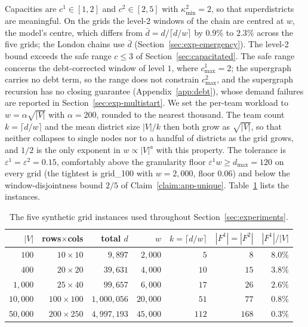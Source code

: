\documentclass[preprint,12pt,authoryear]{elsarticle}
\theoremstyle{definition}
\begin{document}
Capacities are $c^1 \in [1,2]$ and $c^2 \in [2,5]$ with $\kappa^2_{\min} = 2$, so that superdistricts are meaningful. On the grids the level-2 windows of the chain are centred at $w$, the model's centre, which differs from $\bar d = d/\lceil d/w \rceil$ by $0.9\%$ to $2.3\%$ across the five grids; the London chains use $\bar d$ (Section~\ref{sec:exp-emergency}). The level-2 bound exceeds the safe range 
$c \leq 3$ of Section~\ref{sec:capacitated}. The safe range concerns the debt-corrected window of level $1$, where $c^1_{\max} = 2$; the supergraph carries no debt term, so the range does not constrain $c^2_{\max}$, and the supergraph recursion has no closing guarantee (Appendix~\ref{app:debt}), whose demand failures are reported in Section~\ref{sec:exp-multistart}. We set the 
per-team workload to $w = \alpha \sqrt{|V|}$ with $\alpha = 200$, rounded to the 
nearest thousand. The team count $k = \lceil d / w \rceil$ and the mean district 
size $|V|/k$ then both grow as $\sqrt{|V|}$, so that neither collapses to single 
nodes nor to a handful of districts as the grid grows, and $1/2$ is the only 
exponent in $w \propto |V|^a$ with this property. The tolerance is 
$\varepsilon^1 = \varepsilon^2 = 0.15$, comfortably above the granularity floor 
$\varepsilon^1 w \geq d_{\max} = 120$ on every grid (the tightest is grid\_100 
with $w = 2{,}000$, floor $0.06$) and below the window-disjointness bound $2/5$ 
of Claim~\ref{claim:app-unique}. Table~\ref{tab:grids} lists the instances.
%
\begin{table}[!htbp]
\centering
\small
\begin{tabular}{rrrrrrr}
\toprule
$|V|$ & rows$\times$cols & total $d$ & $w$ & $k=\lceil d/w\rceil$ & $|F^1| = |F^2|$ & $|F^1|/|V|$ \\
\midrule
$100$      & $10\times10$   & $9{,}897$       & $2{,}000$  & $5$   & $8$   & $8.0\%$  \\
$400$      & $20\times20$   & $39{,}631$      & $4{,}000$  & $10$  & $15$  & $3.8\%$  \\
$1{,}000$  & $25\times40$   & $99{,}657$      & $6{,}000$  & $17$  & $26$  & $2.6\%$  \\
$10{,}000$ & $100\times100$ & $1{,}000{,}056$ & $20{,}000$ & $51$  & $77$  & $0.8\%$  \\
$50{,}000$ & $200\times250$ & $4{,}997{,}193$ & $45{,}000$ & $112$ & $168$ & $0.3\%$  \\
\bottomrule
\end{tabular}
\caption{The five synthetic grid instances used throughout Section~\ref{sec:experiments}.}
\label{tab:grids}
\end{table}
\end{document}
